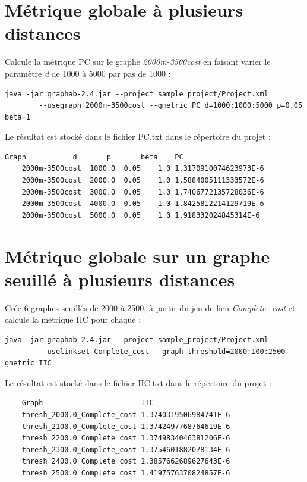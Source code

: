 \documentclass[a4paper,10pt]{report}
\begin{document}
\section{Métrique globale à plusieurs distances}
Calcule la métrique PC sur le graphe \textit{2000m-3500cost} en faisant varier le paramètre \textit{d} de 1000 à 5000 par pas de 1000 :
\begin{Verbatim}[tabsize=4]
	java -jar graphab-2.4.jar --project sample_project/Project.xml
		--usegraph 2000m-3500cost --gmetric PC d=1000:1000:5000 p=0.05 beta=1
\end{Verbatim}
Le résultat est stocké dans le fichier PC.txt dans le répertoire du projet :
\begin{Verbatim}[tabsize=4]
	Graph         	d     	p   	beta	PC
	2000m-3500cost	1000.0	0.05	1.0	1.3170910074623973E-6
	2000m-3500cost	2000.0	0.05	1.0	1.5884005111333572E-6
	2000m-3500cost	3000.0	0.05	1.0	1.7406772135728036E-6
	2000m-3500cost	4000.0	0.05	1.0	1.8425812214129719E-6
	2000m-3500cost	5000.0	0.05	1.0	1.918332024845314E-6
\end{Verbatim}

\section{Métrique globale sur un graphe seuillé à plusieurs distances}
Crée 6 graphes seuillés de 2000 à 2500, à partir du jeu de lien \textit{Complete\_cost} et calcule la métrique IIC pour chaque :
\begin{Verbatim}[tabsize=4]
	java -jar graphab-2.4.jar --project sample_project/Project.xml
		--uselinkset Complete_cost --graph threshold=2000:100:2500 --gmetric IIC
\end{Verbatim}
Le résultat est stocké dans le fichier IIC.txt dans le répertoire du projet :
\begin{Verbatim}
	Graph                      	IIC
	thresh_2000.0_Complete_cost	1.3740319506984741E-6
	thresh_2100.0_Complete_cost	1.3742497768764619E-6
	thresh_2200.0_Complete_cost	1.3749834046381206E-6
	thresh_2300.0_Complete_cost	1.3754601882078134E-6
	thresh_2400.0_Complete_cost	1.3857662689627643E-6
	thresh_2500.0_Complete_cost	1.4197576370824857E-6
\end{Verbatim}
\end{document}
